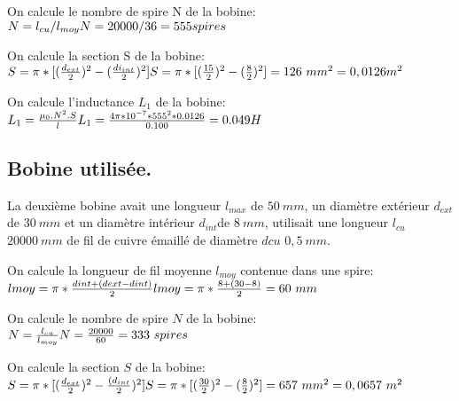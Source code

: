 On calcule le nombre de spire N de la bobine: \\
\begin{math}
	N=l_{cu}/l_{moy} \\
	N= 20000/36 = 555 spires
\end{math}

On calcule la section S de la bobine: \\
\begin{math}
	S= \pi*[(\frac{d_{ext}}{2})^2 - (\frac{di_{int}}{2})^2] \\
	S= \pi*[(\frac{15}{2})^2 - (\frac{8}{2})^2] = 126\ mm^2 = 0,0126 m^2
\end{math}

On calcule l'inductance $L_{1}$ de la bobine: \\
\begin{math}
	L_{1} = \frac{\mu_0.N^2.S}{l} \\
	L_{1} = \frac{4\pi*10^{-7}*555^2*0.0126}{0.100}=0.049 H
\end{math}

\subsection{Bobine utilisée.}
La deuxième bobine avait une longueur $l_{max}$ de $50\ mm$, un
diamètre   extérieur $d_{ext}$ de $30\ mm$ et un diamètre intérieur
$d_{int}$de $8\ mm$,   utilisait une longueur $l_{cu}$ $20000\ mm$ de fil
de cuivre émaillé de   diamètre $d{cu}$ $0,5\ mm$.

On calcule la longueur de fil moyenne $l_{moy}$ contenue dans une
spire: \\
\begin{math}
	l{moy}= \pi*\frac{d{int}+(d{ext}-d{int})}{2} \\
	l{moy}= \pi*\frac{8+(30-8)}{2}= 60\ mm
\end{math}

On calcule le nombre de spire $N$ de la bobine: \\
\begin{math}
	N = \frac{l_{cu}}{l_{moy}} \\
	N = \frac{20000}{60} = 333\ spires
\end{math}

On calcule la section $S$ de la bobine: \\
\begin{math}
	S = \pi*[(\frac{d_{ext}}{2})^2 - \frac{(d_{int}}{2})^2] \\
	S = \pi*[(\frac{30}{2})^2 -(\frac{8}{2})^2] = 657\ mm^2 = 0,0657\ m^2
\end{math}

